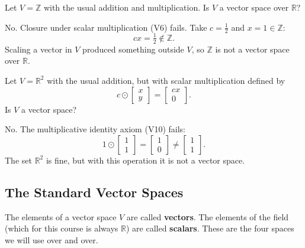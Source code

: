 \begin{example}
Let $V = \mathbb{Z}$ with the usual addition and multiplication. Is $V$ a vector space over $\mathbb{R}$?

\begin{solution}
No. Closure under scalar multiplication (V6) fails. Take $c = \tfrac{1}{2}$ and $x = 1 \in \mathbb{Z}$:
\[
cx = \tfrac{1}{2} \notin \mathbb{Z}.
\]
Scaling a vector in $V$ produced something outside $V$, so $\mathbb{Z}$ is not a vector space over $\mathbb{R}$.
\end{solution}
\end{example}

\begin{example}
Let $V = \mathbb{R}^2$ with the usual addition, but with scalar multiplication defined by
\[
c \odot \begin{bmatrix} x \\ y \end{bmatrix} = \begin{bmatrix} cx \\ 0 \end{bmatrix}.
\]
Is $V$ a vector space?

\begin{solution}
No. The multiplicative identity axiom (V10) fails:
\[
1 \odot \begin{bmatrix} 1 \\ 1 \end{bmatrix} = \begin{bmatrix} 1 \\ 0 \end{bmatrix} \neq \begin{bmatrix} 1 \\ 1 \end{bmatrix}.
\]
The set $\mathbb{R}^2$ is fine, but with this operation it is not a vector space.
\end{solution}
\end{example}

\subsection{The Standard Vector Spaces}

The elements of a vector space $V$ are called \textbf{vectors}. The elements of the field (which for this course is always $\mathbb{R}$) are called \textbf{scalars}. These are the four spaces we will use over and over.

